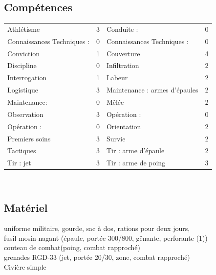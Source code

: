 \documentclass{report}
\begin{document}
\subsection*{Compétences}
\begin{tabular}{p{}| r || p{}| r|}
Athlétisme & 3 &Conduite : & 0\\
Connaissances Techniques : & 0 &Connaissances Techniques : & 0\\
Conviction & 1 &Couverture& 4\\
Discipline & 0 &Infiltration& 2\\
Interrogation & 1 & Labeur& 2\\
Logistique & 3 & Maintenance : armes d'épaules& 2\\
Maintenance: & 0& Mêlée& 2\\
Observation & 3 & Opération : & 0\\
Opération : & 0 & Orientation& 2\\
Premiers soins & 3 & Survie& 2\\
Tactiques & 3 & Tir : arme d'épaule& 2\\
Tir : jet & 3 & Tir : arme de poing & 3\\
\end{tabular}\\
\noindent\makebox[\linewidth]{\rule{\textwidth}{0.4pt}}
\subsection*{Matériel}
uniforme militaire, gourde, sac à dos, rations pour deux jours,\\
fusil mosin-nagant (épaule, portée 300/800, gênante, perforante (1)) \\
couteau de combat(poing, combat rapproché)\\
grenades RGD-33 (jet, portée 20/30, zone, combat rapproché)\\
Civière simple\\
\noindent\makebox[\linewidth]{\rule{\textwidth}{0.4pt}}
\end{document}
